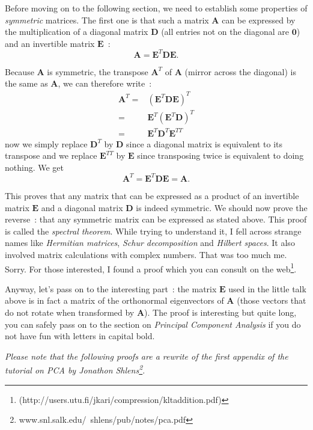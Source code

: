 \documentclass[11pt,twocolumn]{amsart} %
\newcommand{\ve}[1]{\boldsymbol{#1}}
\newcommand{\ma}[1]{\boldsymbol{#1}}
\begin{document}
Before moving on to the following section, we need to establish some properties of \emph{symmetric} matrices. The first one is that such a matrix $\ma{A}$ can be expressed by the multiplication of a diagonal matrix $\ma{D}$ (all entries not on the diagonal are $\ve{0}$) and an invertible matrix $\ma{E}$~:
\begin{equation*}
  \ma{A} = \ma{E}^T\ma{D}\ma{E}. \label{symmetric}
\end{equation*}

Because $\ma{A}$ is symmetric, the transpose $\ma{A}^T$ of $\ma{A}$ (mirror across the diagonal) is the same as $\ma{A}$, we can therefore write~:
\begin{align*}
  \ma{A}^T = & (\ma{E}^T\ma{D}\ma{E})^T \\
           = &  \ma{E}^T(\ma{E}^T\ma{D})^T \\
           = &  \ma{E}^T\ma{D}^T\ma{E}^{TT}
\end{align*}
now we simply replace $\ma{D}^T$ by $\ma{D}$ since a diagonal matrix is equivalent to its transpose and we replace $\ma{E}^{TT}$ by $\ma{E}$ since transposing twice is equivalent to doing nothing. We get
\[
  \ma{A}^T = \ma{E}^T\ma{D}\ma{E} = \ma{A}.
\]

This proves that any matrix that can be expressed as a product of an invertible matrix $\ma{E}$ and a diagonal matrix $\ma{D}$ is indeed symmetric. We should now prove the reverse~: that any symmetric matrix can be expressed as stated above. This proof is called the \emph{spectral theorem}. While trying to understand it, I fell across strange names like \emph{Hermitian matrices}, \emph{Schur decomposition} and \emph{Hilbert spaces}. It also involved matrix calculations with complex numbers. That was too much me. Sorry. For those interested, I found a proof which you can consult on the web\footnote{(http://users.utu.fi/jkari/compression/kltaddition.pdf)}.

Anyway, let's pass on to the interesting part~: the matrix $\ma{E}$ used in the little talk above is in fact a matrix of the orthonormal eigenvectors of $\ma{A}$ (those vectors that do not rotate when transformed by $\ma{A}$). The proof is interesting but quite long, you can safely pass on to the section on \emph{Principal Component Analysis} if you do not have fun with letters in capital bold.

\emph{Please note that the following proofs are a rewrite of the first appendix of the tutorial on PCA by Jonathon Shlens\footnote{www.snl.salk.edu/~shlens/pub/notes/pca.pdf}}.
\end{document}

